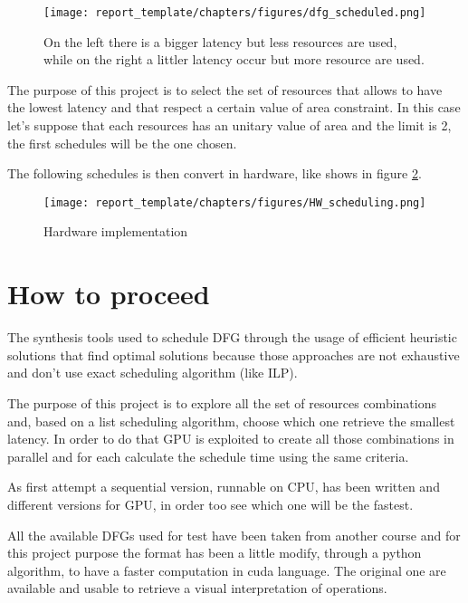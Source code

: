 \begin{figure}[h]
\centering
\texttt{[image: report\_template/chapters/figures/dfg\_scheduled.png]}
\caption{On the left there is a bigger latency but less resources are used, while on the right a littler latency occur but more resource are used.}
\label{fig:DFG_schedules}
\end{figure}

The purpose of this project is to select the set of resources that allows to have the lowest latency and that respect a certain value of area constraint.
In this case let's suppose that each resources has an unitary value of area and the limit is 2,  the first schedules will be the one chosen.

The following schedules is then convert in hardware, like shows in figure \ref{fig:HW_schedules}.

\begin{figure}[h]
\centering
\texttt{[image: report\_template/chapters/figures/HW\_scheduling.png]}
\caption{Hardware implementation}
\label{fig:HW_schedules}
\end{figure}

\section{How to proceed}

The synthesis tools used to schedule DFG through the usage of efficient heuristic solutions that find optimal solutions because those approaches are not exhaustive and don't use exact scheduling algorithm (like ILP). 

The purpose of this project is to explore all the set of resources combinations and, based on a list scheduling algorithm, choose which one retrieve the smallest latency. In order to do that GPU is exploited to create all those combinations in parallel and for each calculate the schedule time using the same criteria.

As first attempt a sequential version, runnable on CPU, has been written and different versions for GPU, in order too see which one will be the fastest.

All the available DFGs used for test have been taken from another course and for this project purpose the format has been a little modify, through a python algorithm, to have a faster computation in cuda language. The original one are available and usable to retrieve a visual interpretation of operations.








